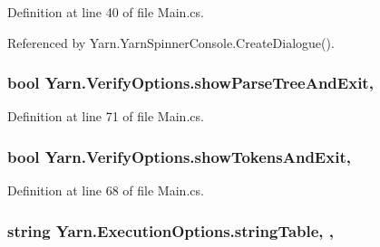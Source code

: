 Definition at line 40 of file Main.\-cs.



Referenced by Yarn.\-Yarn\-Spinner\-Console.\-Create\-Dialogue().

\hypertarget{a00182_abef6bf44ae4792d7644b1c02de625208}{
\subsubsection[{show\-Parse\-Tree\-And\-Exit}]{\setlength{\rightskip}{0pt plus 5cm}bool Yarn.\-Verify\-Options.\-show\-Parse\-Tree\-And\-Exit\hspace{0.3cm}{\ttfamily [get]}, {\ttfamily [set]}}}\label{a00182_abef6bf44ae4792d7644b1c02de625208}


Definition at line 71 of file Main.\-cs.

\hypertarget{a00182_ab1a387df201e3e136c15e5744219628d}{
\subsubsection[{show\-Tokens\-And\-Exit}]{\setlength{\rightskip}{0pt plus 5cm}bool Yarn.\-Verify\-Options.\-show\-Tokens\-And\-Exit\hspace{0.3cm}{\ttfamily [get]}, {\ttfamily [set]}}}\label{a00182_ab1a387df201e3e136c15e5744219628d}


Definition at line 68 of file Main.\-cs.

\hypertarget{a00093_a7e43c3b73722956cb0f5d507e4eef527}{
\subsubsection[{string\-Table}]{\setlength{\rightskip}{0pt plus 5cm}string Yarn.\-Execution\-Options.\-string\-Table\hspace{0.3cm}{\ttfamily [get]}, {\ttfamily [set]}, {\ttfamily [inherited]}}}\label{a00093_a7e43c3b73722956cb0f5d507e4eef527}


